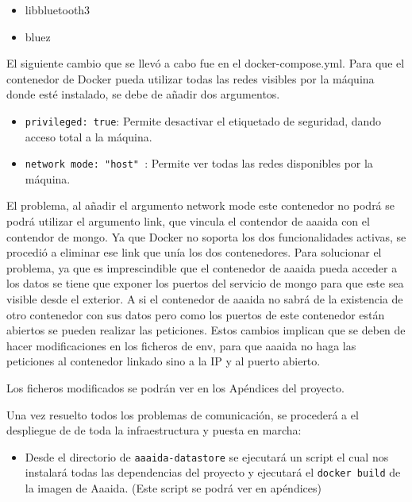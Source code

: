 \begin{itemize}
\item libbluetooth3
\item bluez
\end{itemize}

El siguiente cambio que se llevó a cabo fue en el docker-compose.yml. Para que el contenedor de Docker pueda utilizar todas las redes visibles por la máquina donde esté instalado, se debe de añadir dos argumentos.

\begin{itemize}
\item \texttt{privileged: true}: Permite desactivar el etiquetado de seguridad, dando acceso total a la máquina. 
\item \texttt{network mode: "host" }: Permite ver todas las redes disponibles por la máquina. 
\end{itemize}

El problema, al añadir el argumento network mode este contenedor no podrá se podrá utilizar el argumento link, que vincula el contendor de aaaida con el contendor de mongo.  Ya que Docker no soporta los dos funcionalidades activas, se procedió a eliminar ese link que unía los dos contenedores. Para solucionar el problema, ya que es imprescindible que el contenedor de aaaida pueda acceder a los datos se tiene que exponer los puertos del servicio de mongo para que este sea visible desde el exterior. A si el contenedor de aaaida no sabrá de la existencia de otro contenedor con sus datos pero como los puertos de este contenedor están abiertos se pueden realizar las peticiones. Estos cambios implican que se deben de hacer modificaciones en los ficheros de env, para que aaaida no haga las peticiones al contenedor linkado sino a la IP y al puerto abierto.

Los ficheros modificados se podrán ver en los Apéndices del proyecto. 

Una vez resuelto todos los problemas de comunicación, se procederá a el despliegue de de toda la infraestructura y puesta en marcha:

\begin{itemize}
\item Desde el directorio de \texttt{aaaida-datastore} se ejecutará un script el cual nos instalará todas las dependencias del proyecto y ejecutará el  \texttt{docker build} de la imagen de Aaaida. (Este script se podrá ver en apéndices) 
\end{itemize}


